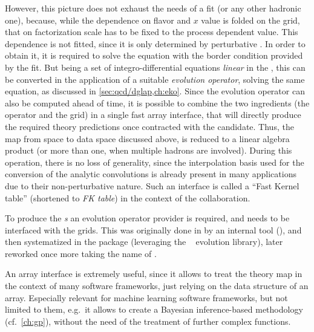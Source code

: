 However, this picture does not exhaust the needs of a \pdf fit (or any other
hadronic one), because, while the \pdf dependence on flavor and $x$ value is
folded on the grid, that on factorization scale has to be fixed to the process
dependent value.
This dependence is not fitted, since it is only determined by perturbative
\qcd.
In order to obtain it, it is required to solve the \dglap equation with the
border condition provided by the fit.
But being \dglap a set of integro-differential equations \textit{linear} in the
\pdf, this can be converted in the application of a suitable \textit{evolution
operator}, solving the same equation, as discussed in
\cref{sec:qcd/dglap,ch:eko}.
Since the evolution operator can also be computed ahead of time, it is possible
to combine the two ingredients (the operator and the grid) in a single fast
array interface, that will directly produce the required theory predictions
once contracted with the \pdf candidate.
Thus, the map from \pdf space to data space discussed above, is reduced to a
linear algebra product (or more than one, when multiple hadrons are involved).
During this operation, there is no loss of generality, since the interpolation
basis used for the conversion of the analytic convolutions is already present
in many \pdf applications due to their non-perturbative nature.
Such an interface is called a \enquote{Fast Kernel table} (shortened to
\textit{FK table}) in the context of the \nnpdf collaboration.

To produce the \textit{\fktab{}s} an evolution operator provider is required,
and needs to be interfaced with the grids. This was originally done in \nnpdf
by an internal tool (\fkgen), and then systematized in the \apfelgrid
\cite{Bertone:2016lga} package (leveraging the \apfel~\cite{Bertone:2013vaa}
evolution library), later reworked once more taking the name of \apfelcomb
\cite{APFELcomb}.

An array interface is extremely useful, since it allows to treat the theory map
in the context of many software frameworks, just relying on the data structure
of an array. Especially relevant for machine
learning software frameworks, but not limited to them, e.g.\ it allows to
create a Bayesian inference-based methodology (cf.\ \cref{ch:gp}), without the
need of the treatment of further complex functions.
